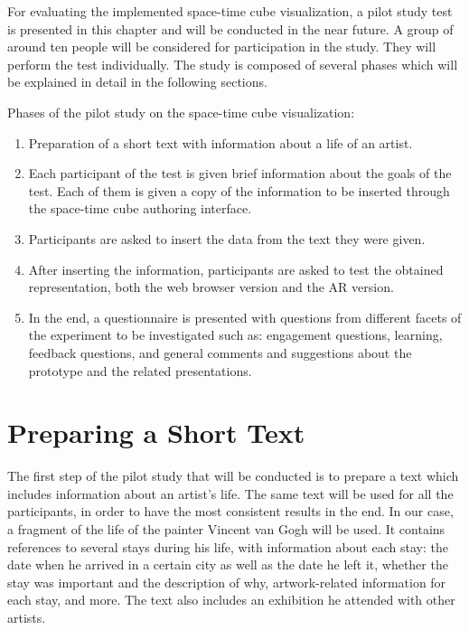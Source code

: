 For evaluating the implemented space-time cube visualization, a pilot study test is presented in this chapter and will be conducted in the near
future. A group of around ten people will be considered for participation in the study. They will perform the test
individually. The study is composed of several phases which will be explained in detail in the following sections.

Phases of the pilot study on the  space-time cube visualization:
\begin{enumerate}
    \item Preparation of a short text with information about a life of an artist.
    \item Each participant of the test is given brief information about the goals of the test. Each of them is given a copy of the information to be inserted through the space-time cube authoring interface.
    \item Participants are asked to insert the data from the text they were given.
    \item After inserting the information, participants are asked to test the obtained representation, both the web browser version and the AR version.
    \item In the end, a questionnaire is presented with questions from different facets of the experiment to be investigated such as: engagement questions, learning, feedback questions, and general comments and suggestions about the prototype and the related presentations.
\end{enumerate}

\section{Preparing a Short Text}\label{sec:preparing-short-text}
The first step of the pilot study that will be conducted is to prepare a text which includes information about an artist's life. The same text will
be used for all the participants, in order to have the most consistent results in the end. In our case, a fragment of the life of the painter
Vincent van Gogh will be used. It contains references to several stays during his life, with information about each stay: the date when he arrived
in a certain city as well as the date he left it, whether the stay was important and the description of why, artwork-related information for each
stay, and more. The text also includes an exhibition he attended with other artists.

